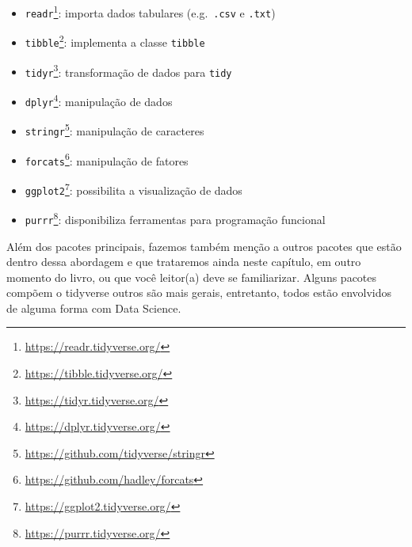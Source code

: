 \documentclass[
]{book}
\providecommand{\tightlist}{%
  \setlength{\itemsep}{0pt}\setlength{\parskip}{0pt}}
\renewcommand{\href}[2]{#2\footnote{\url{#1}}}
\begin{document}
\begin{itemize}
\tightlist
\item
  \href{https://readr.tidyverse.org/}{\texttt{readr}}: importa dados tabulares (e.g.~\texttt{.csv} e \texttt{.txt})
\item
  \href{https://tibble.tidyverse.org/}{\texttt{tibble}}: implementa a classe \texttt{tibble}
\item
  \href{https://tidyr.tidyverse.org/}{\texttt{tidyr}}: transformação de dados para \texttt{tidy}
\item
  \href{https://dplyr.tidyverse.org/}{\texttt{dplyr}}: manipulação de dados
\item
  \href{https://github.com/tidyverse/stringr}{\texttt{stringr}}: manipulação de caracteres
\item
  \href{https://github.com/hadley/forcats}{\texttt{forcats}}: manipulação de fatores
\item
  \href{https://ggplot2.tidyverse.org/}{\texttt{ggplot2}}: possibilita a visualização de dados
\item
  \href{https://purrr.tidyverse.org/}{\texttt{purrr}}: disponibiliza ferramentas para programação funcional
\end{itemize}

Além dos pacotes principais, fazemos também menção a outros pacotes que estão dentro dessa abordagem e que trataremos ainda neste capítulo, em outro momento do livro, ou que você leitor(a) deve se familiarizar. Alguns pacotes compõem o tidyverse outros são mais gerais, entretanto, todos estão envolvidos de alguma forma com Data Science.
\end{document}
